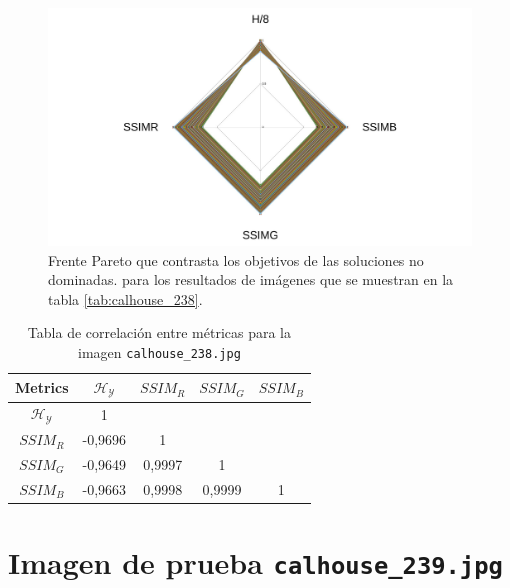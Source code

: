     \begin{figure}[H]
    \centering
    \includegraphics[width=\textwidth]{./Figures/calhouse_238/calhouse_238_2.jpg}
    \caption{Frente Pareto que contrasta los objetivos de las soluciones no dominadas. para los resultados de imágenes que se muestran en la tabla \ref{tab:calhouse_238}.}
    \label{fig:calhouse2372fp}
    \end{figure}

\begin{table}[H]
\setlength{\abovecaptionskip}{2pt plus 3pt minus 2pt} %
\caption[Parámetros de entrada para $MOPSO$]{Tabla de correlación entre métricas para la imagen \texttt{calhouse\_238.jpg}}
\begin{center}
 \begin{tabular}{||c | c c c c||} 
 \hline
Metrics & $\mathscr{H_Y}$ & $SSIM_R$ & $SSIM_G$ & $SSIM_B$ \\ 
\hline
$\mathscr{H_Y}$ & 1 &  &  & \\ 
\hline
$SSIM_R$ & -0,9696 & 1 &  \\ 
\hline
$SSIM_G$ & -0,9649 & 0,9997  & 1  & \\ 
\hline
$SSIM_B$ & -0,9663 & 0,9998  & 0,9999  & 1 \\ 
\hline
\end{tabular}
\end{center}
\label{table:correlacion}
\end{table}


\section{Imagen de prueba \texttt{calhouse\_239.jpg}}

